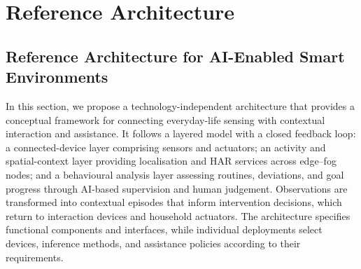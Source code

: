 \documentclass[10pt,twocolumn]{article}
\begin{document}
%
%
%


\section{Reference Architecture}
\label{sec:reference-architecture}
\subsection{Reference Architecture for AI-Enabled Smart Environments}
\label{subsec:general-architecture}

In this section, we propose a technology-independent architecture that provides a conceptual framework for connecting everyday-life sensing with contextual interaction and assistance. It follows a layered model with a closed feedback loop: a connected-device layer comprising sensors and actuators; an activity and spatial-context layer providing localisation and HAR services across edge--fog nodes; and a behavioural analysis layer assessing routines, deviations, and goal progress through AI-based supervision and human judgement. Observations are transformed into contextual episodes that inform intervention decisions, which return to interaction devices and household actuators. The architecture specifies functional components and interfaces, while individual deployments select devices, inference methods, and assistance policies according to their requirements.
\end{document}
